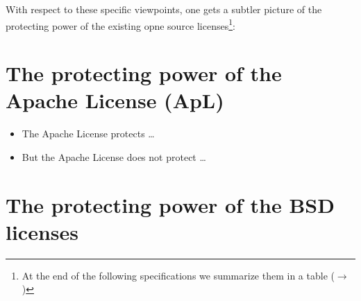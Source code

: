 With respect to these specific viewpoints, one gets a subtler picture of the
protecting power of the existing opne source licenses\footnote{At the end of the
following specifications we summarize them in a table ($\rightarrow$
\pageref{PowerOfLicenseTable})}:

\section{The protecting power of the Apache License (ApL)}
\begin{itemize} 
  \item The Apache License protects \ldots
  \item But the Apache License does not protect \ldots
\end{itemize}

\section{The protecting power of the BSD licenses}
